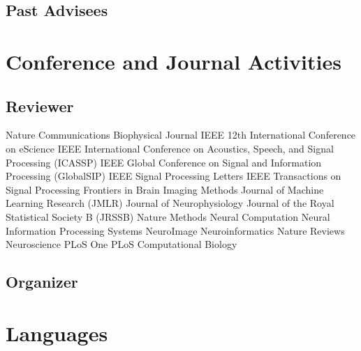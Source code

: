 \documentclass[10pt,colorlinks=true,urlcolor=blue]{moderncv}
\begin{document}
\subsection{Past Advisees}


\section{Conference and Journal Activities}

\subsection{Reviewer}
\cventry {} {Nature Communications} {}{}{}{}
\cventry {} {Biophysical Journal} {}{}{}{}
\cventry {} {IEEE 12th International Conference on eScience} {}{}{}{} 
\cventry {} {IEEE International Conference on Acoustics, Speech, and Signal Processing (ICASSP)} {}{}{}{}
\cventry {} {IEEE Global Conference on Signal and Information Processing (GlobalSIP)} {} {} {} {}
\cventry {} {IEEE Signal Processing Letters} {} {} {} {} 
\cventry {} {IEEE Transactions on Signal Processing} {}{}{}{}
\cventry {} {Frontiers in Brain Imaging Methods} {}{}{}{}
\cventry {} {Journal of Machine Learning Research (JMLR)} {}{}{}{}
\cventry {} {Journal of Neurophysiology} {}{}{}{}
\cventry {} {Journal of the Royal Statistical Society B (JRSSB)} {}{}{}{}
\cventry {} {Nature Methods} {}{}{}{}
\cventry {} {Neural Computation} {}{}{}{}
\cventry {} {Neural Information Processing Systems} {}{}{}{}
\cventry {} {NeuroImage} {}{}{}{}
\cventry {} {Neuroinformatics} {}{}{}{}
\cventry {} {Nature Reviews Neuroscience} {}{}{}{}
\cventry {} {PLoS One} {}{}{}{}
\cventry {} {PLoS Computational Biology} {}{}{}{}


\subsection{Organizer}




\section{Languages}
\end{document}
